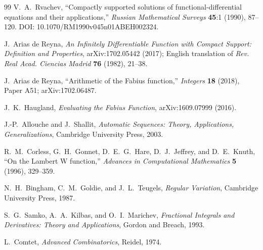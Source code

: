 \documentclass[11pt,oneside]{article}
\theoremstyle{definition}
\theoremstyle{remark}
\newcommand{\1}{\mathbf 1}
\begin{document}
\begin{thebibliography}{99}
V.~A.~Rvachev,
``Compactly supported solutions of functional-differential equations and their
applications,'' \emph{Russian Mathematical Surveys} \textbf{45}:1 (1990),
87--120.  DOI: 10.1070/RM1990v045n01ABEH002324.

J.~Arias de Reyna,
\emph{An Infinitely Differentiable Function with Compact Support: Definition
and Properties}, arXiv:1702.05442 (2017); English translation of
\emph{Rev. Real Acad. Ciencias Madrid} \textbf{76} (1982), 21--38.

J.~Arias de Reyna,
``Arithmetic of the Fabius function,'' \emph{Integers} \textbf{18} (2018),
Paper A51; arXiv:1702.06487.

J.~K.~Haugland,
\emph{Evaluating the Fabius Function}, arXiv:1609.07999 (2016).

J.-P.~Allouche and J.~Shallit,
\emph{Automatic Sequences: Theory, Applications, Generalizations},
Cambridge University Press, 2003.

R.~M.~Corless, G.~H.~Gonnet, D.~E.~G.~Hare, D.~J.~Jeffrey, and D.~E.~Knuth,
``On the Lambert W function,'' \emph{Advances in Computational Mathematics}
\textbf{5} (1996), 329--359.

N.~H.~Bingham, C.~M.~Goldie, and J.~L.~Teugels,
\emph{Regular Variation}, Cambridge University Press, 1987.

S.~G.~Samko, A.~A.~Kilbas, and O.~I.~Marichev,
\emph{Fractional Integrals and Derivatives: Theory and Applications},
Gordon and Breach, 1993.

L.~Comtet,
\emph{Advanced Combinatorics}, Reidel, 1974.

\end{thebibliography}
\end{document}
